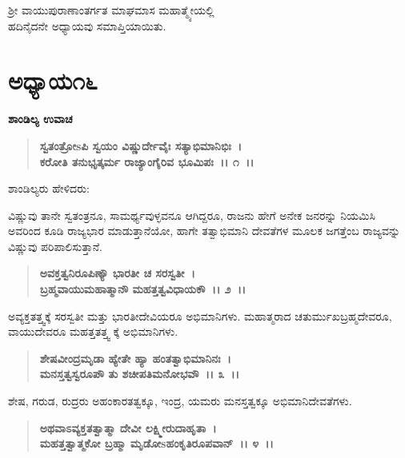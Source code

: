 \begin{center}
ಶ‍್ರೀ ವಾಯುಪುರಾಣಾಂತರ್ಗತ ಮಾಘಮಾಸ ಮಹಾತ್ಮ್ಯೇಯಲ್ಲಿ \\ ಹದಿನೈದನೇ ಅಧ್ಯಾಯವು ಸಮಾಪ್ತಿಯಾಯಿತು.
\end{center}

\newpage

\section*{ಅಧ್ಯಾಯ\enginline{-}೧೬}

\emptypage

\begin{flushleft}
\textbf{ಶಾಂಡಿಲ್ಯ ಉವಾಚ \enginline{-}}
\end{flushleft}

\begin{verse}
\textbf{ಸ್ವತಂತ್ರೋsಪಿ ಸ್ವಯಂ ವಿಷ್ಣುರ್ದೇವೈಃ ಸತ್ಯಾಭಿಮಾನಿಭಿಃ~।}\\\textbf{ಕರೋತಿ ತನುಭೃತ್ಕರ್ಮ ರಾಜ್ಯಾಂಗೈರಿವ ಭೂಮಿಪಃ~।। ೧~।।}
\end{verse}

\begin{flushleft}
ಶಾಂಡಿಲ್ಯರು ಹೇಳಿದರು:
\end{flushleft}

ವಿಷ್ಣುವು ತಾನೇ ಸ್ವತಂತ್ರನೂ, ಸಾಮರ್ಥ್ಯವುಳ್ಳವನೂ ಆಗಿದ್ದರೂ, ರಾಜನು ಹೇಗೆ ಅನೇಕ ಜನರನ್ನು ನಿಯಮಿಸಿ ಅವರಿಂದ ಕೂಡಿ ರಾಜ್ಯಭಾರ ಮಾಡುತ್ತಾನೆಯೋ, ಹಾಗೇ ತತ್ವಾಭಿಮಾನಿ ದೇವತೆಗಳ ಮೂಲಕ ಜಗತ್ತೆಂಬ ರಾಜ್ಯವನ್ನು ವಿಷ್ಣುವು ಪರಿಪಾಲಿಸುತ್ತಾನೆ.

\begin{verse}
\textbf{ಅವಕ್ತತ್ವನಿರೂಪಿಣ್ಯೌ ಭಾರತೀ ಚ ಸರಸ್ವತೀ~।}\\\textbf{ಬ್ರಹ್ಮವಾಯುಮಹಾತ್ಮಾನೌ ಮಹತ್ತತ್ವವಿಧಾಯಕೌ~।। ೨~।।}
\end{verse}

ಅವ್ಯಕ್ತತತ್ತ್ವಕ್ಕೆ ಸರಸ್ವತೀ ಮತ್ತು ಭಾರತೀದೇವಿಯರೂ ಅಭಿಮಾನಿಗಳು. ಮಹಾತ್ಮರಾದ ಚತುರ್ಮುಖಬ್ರಹ್ಮದೇವರೂ, ವಾಯುದೇವರೂ ಮಹತ್ತತತ್ತ್ವ ಕ್ಕೆ ಅಭಿಮಾನಿಗಳು.

\begin{verse}
\textbf{ಶೇಷವೀಂದ್ರಮೃಡಾ ಹ್ಯೇತೇ ಹ್ಯಾ ಹಂತತ್ವಾಭಿಮಾನಿನಃ~।}\\\textbf{ಮನಸ್ತತ್ವಸ್ವರೂಪೌ ತು ಶಚೀಪತಿಮನೋಭವೌ~।। ೩~।।}
\end{verse}

ಶೇಷ, ಗರುಡ, ರುದ್ರರು ಅಹಂಕಾರತತ್ವಕ್ಕೂ, ಇಂದ್ರ, ಯಮರು ಮನಸ್ತತ್ವಕ್ಕೂ ಅಭಿಮಾನಿದೇವತೆಗಳು.

\begin{verse}
\textbf{ಅಥವಾಽವ್ಯಕ್ತತತ್ವಾತ್ಮಾ ದೇವೀ ಲಕ್ಷ್ಮೀರುದಾಹೃತಾ~।}\\\textbf{ಮಹತ್ತತ್ವಾತ್ಮಕೋ ಬ್ರಹ್ಮಾ ಮೃಡೋsಹಂಕೃತಿರೂಪವಾನ್~।। ೪~।।}
\end{verse}

